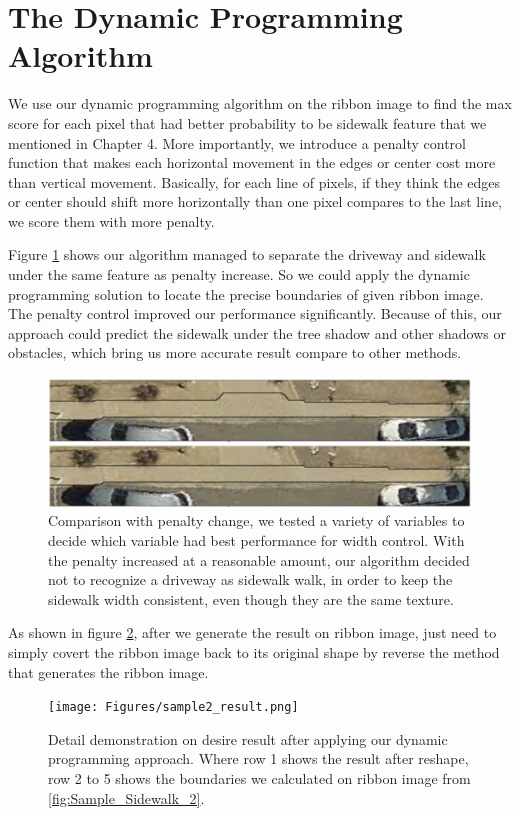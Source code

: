 \section{The Dynamic Programming Algorithm}

We use our dynamic programming algorithm on the ribbon image to find the max score for each pixel that had better probability to be sidewalk feature that we mentioned in Chapter 4. 
More importantly, we introduce a penalty control function that makes each horizontal movement in the edges or center cost more than vertical movement. Basically, for each line of pixels, if they think the edges or center should shift more horizontally than one pixel compares to the last line, we score them with more penalty. 

Figure \ref{fig:penalty} shows our algorithm managed to separate the driveway and sidewalk under the same feature as penalty increase. So we could apply the dynamic programming solution to locate the precise boundaries of given ribbon image. The penalty control improved our performance significantly. Because of this, our approach could predict the sidewalk under the tree shadow and other shadows or obstacles, which bring us more accurate result compare to other methods.
\begin{figure}[H]
    \centering
    \includegraphics[width=\textwidth]{Figures/penalty.png}
    \caption[Penalty Process]{Comparison with penalty change, we tested a variety of variables to decide which variable had best performance for width control. With the penalty increased at a reasonable amount, our algorithm decided not to recognize a driveway as sidewalk walk, in order to keep the sidewalk width consistent, even though they are the same texture.}
    \label{fig:penalty}
\end{figure}
As shown in figure \ref{fig:sample_result2}, after we generate the result on ribbon image, just need to simply covert the ribbon image back to its original shape by reverse the method that generates the ribbon image. 

\begin{figure}[H]
    \centering
    \texttt{[image: Figures/sample2\_result.png]}
    \caption[Desire Output on Sample Sidewalk]{Detail demonstration on desire result after applying our dynamic programming approach. Where row 1 shows the result after reshape, row 2 to 5 shows the boundaries we calculated on ribbon image from \ref{fig:Sample_Sidewalk_2}.}
    \label{fig:sample_result2}
\end{figure}

